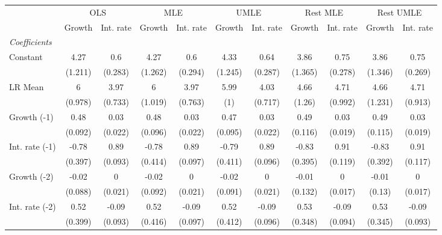 \begin{table}[htbp] 
	\centering
	\begin{tabular}{@{\extracolsep{4pt}}lcccccccccc@{}}		\hline\hline
		 		 & \multicolumn{2}{c}{OLS} &\multicolumn{2}{c}{MLE} &\multicolumn{2}{c}{UMLE} &\multicolumn{2}{c}{Rest MLE} &\multicolumn{2}{c}{Rest UMLE} \\ 
 		 & Growth 	 & Int. rate 	 & Growth 	 & Int. rate 	 & Growth 	 & Int. rate 	 & Growth 	 & Int. rate 	 & Growth 	 & Int. rate\\\cline{2-3}\cline{4-5}\cline{6-7}\cline{8-9}\cline{10-11}
\rule{0pt}{4ex} 
 \emph{Coefficients} 	  		 & 		 & 		 & 		 & 		 & 		 & 		 & 		 & 		 & 		 &\\ 
\quad Constant 	 & 4.27 	 & 0.6 	 & 4.27 	 & 0.6 	 & 4.33 	 & 0.64 	 & 3.86 	 & 0.75 	 & 3.86 	 & 0.75	 \\ 
 		 & (1.211) 	 & (0.283) 	 & (1.262) 	 & (0.294) 	 & (1.245) 	 & (0.287) 	 & (1.365) 	 & (0.278) 	 & (1.346) 	 & (0.269) 	 \\ 
\quad LR Mean 	 & 6 	 & 3.97 	 & 6 	 & 3.97 	 & 5.99 	 & 4.03 	 & 4.66 	 & 4.71 	 & 4.66 	 & 4.71	 \\ 
 		 & (0.978) 	 & (0.733) 	 & (1.019) 	 & (0.763) 	 & (1) 	 & (0.717) 	 & (1.26) 	 & (0.992) 	 & (1.231) 	 & (0.913) 	 \\ 
\quad Growth (-1) 	 &0.48 	 & 0.03 	 & 0.48 	 & 0.03 	 & 0.47 	 & 0.03 	 & 0.49 	 & 0.03 	 & 0.49 	 & 0.03	 \\ 
 		 & (0.092) 	 & (0.022) 	 & (0.096) 	 & (0.022) 	 & (0.095) 	 & (0.022) 	 & (0.116) 	 & (0.019) 	 & (0.115) 	 & (0.019) 	 \\ 
\quad Int. rate (-1) 	 &-0.78 	 & 0.89 	 & -0.78 	 & 0.89 	 & -0.79 	 & 0.89 	 & -0.83 	 & 0.91 	 & -0.83 	 & 0.91	 \\ 
 		 & (0.397) 	 & (0.093) 	 & (0.414) 	 & (0.097) 	 & (0.411) 	 & (0.096) 	 & (0.395) 	 & (0.119) 	 & (0.392) 	 & (0.117) 	 \\ 
\quad Growth (-2) 	 &-0.02 	 & 0 	 & -0.02 	 & 0 	 & -0.02 	 & 0 	 & -0.01 	 & 0 	 & -0.01 	 & 0	 \\ 
 		 & (0.088) 	 & (0.021) 	 & (0.092) 	 & (0.021) 	 & (0.091) 	 & (0.021) 	 & (0.132) 	 & (0.017) 	 & (0.13) 	 & (0.017) 	 \\ 
\quad Int. rate (-2) 	 &0.52 	 & -0.09 	 & 0.52 	 & -0.09 	 & 0.52 	 & -0.09 	 & 0.53 	 & -0.09 	 & 0.53 	 & -0.09	 \\ 
 		 & (0.399) 	 & (0.093) 	 & (0.416) 	 & (0.097) 	 & (0.412) 	 & (0.096) 	 & (0.348) 	 & (0.094) 	 & (0.345) 	 & (0.093) 	 \\ 

\end{tabular}
\end{table}

